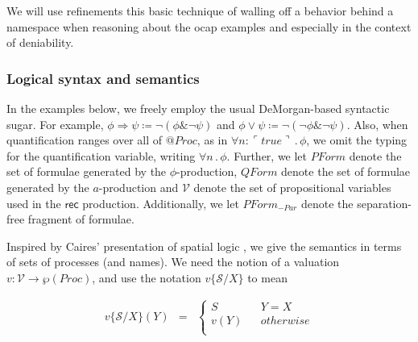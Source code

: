 \documentclass[submission,copyright,creativecommons]{eptcs}
\makeatletter
\newcommand{\lpquote}{\ulcorner}
\newcommand{\rpquote}{\urcorner}
\newcommand{\id}[1]{\texttt{#1}}
\newcommand{\pzero}{\mathbin{0}}
\newcommand{\juxtap}{\mathbin{\id{|}}}
\newcommand{\quotep}[1]{@#1}
\newcommand{\substn}[2]{\id{\{} #1 / #2 \id{\}}}
\newcommand{\Proc}{\mathbin{Proc}}
\newcommand{\QProc}{\quotep{\mathbin{Proc}}}
\newcommand{\defneqls}{\coloneqq}
\newcommand{\ptrue}{\mathbin{true}}
\newcommand{\pdropf}[1]{\rpquote #1 \lpquote}
\newcommand{\pquotep}[1]{\lpquote #1 \rpquote}
\newcommand{\plift}[2]{#1 ! ( #2 )}
\newcommand{\pprefix}[3]{\langle #1 ? #2 \rangle #3}
\newcommand{\pgfp}[2]{\textsf{rec} \; #1 \mathbin{.} #2}
\newcommand{\pquant}[3]{\forall #1 \mathbin{:} #2 \mathbin{.} #3}
\newcommand{\pquantuntyped}[2]{\forall #1 \mathbin{.} #2}
\newcommand{\PFormula}{\mathbin{PForm}}
\newcommand{\QFormula}{\mathbin{QForm}}
\newcommand{\PropVar}{\mathbin{\mathcal{V}}}
\newcommand{\bc}{\mathbin{\mathbf{::=}}}
\numberwithin{equation}{subsection}
\makeatother
\begin{document}
We will use refinements this basic technique of walling off a behavior
behind a namespace when reasoning about the ocap examples and
especially in the context of deniability.

\subsubsection{Logical syntax and semantics}


In the examples below, we freely employ the usual DeMorgan-based
syntactic sugar. For example, $\phi \Rightarrow \psi \defneqls \neg (
\phi \& \neg \psi )$ and $\phi \vee \psi \defneqls \neg ( \neg \phi \&
\neg \psi )$. Also, when quantification ranges over all of $\QProc$,
as in $\pquant{n}{\pquotep{\ptrue}}{\phi}$, we omit the typing for the
quantification variable, writing $\pquantuntyped{n}{\phi}$. Further,
we let $\PFormula$ denote the set of formulae generated by the
$\phi$-production, $\QFormula$ denote the set of formulae generated by
the $a$-production and $\PropVar$ denote the set of propositional
variables used in the $\textsf{rec}$ production. Additionally, we let
$\PFormula_{-Par}$ denote the separation-free fragment of formulae.

Inspired by Caires' presentation of spatial logic
\cite{DBLP:conf/fossacs/Caires04}, we give the semantics in terms of
sets of processes (and names). We need the notion of a valuation $v :
\PropVar \to \wp(\Proc)$, and use the notation $v\substn{\mathcal{S}}{X}$ to mean 

\begin{eqnarray}
  v\substn{\mathcal{S}}{X}(Y) & = &
  \left\{ \begin{array}{ccc}
      S & & Y = X \\
      v(Y) & & otherwise \\
    \end{array}
  \right.\nonumber
\end{eqnarray}
\end{document}
